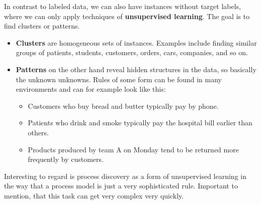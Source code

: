 In contrast to labeled data, we can also have instances without target labels, where we can only apply techniques of \textbf{unsupervised learning}. The goal is to find clusters or patterns.
\begin{itemize}
  \item \textbf{Clusters} are homogeneous sets of instances. Examples include finding {\color{ForestGreen}similar groups of patients, students, customers, orders, cars, companies}, and so on.
  \item \textbf{Patterns} on the other hand reveal hidden structures in the data, so basically the unknown unknowns. Rules of some form can be found in many environments and can for example look like this:
  \begin{itemize}
    \item {\color{ForestGreen}Customers who buy bread and butter typically pay by phone.}
    \item {\color{ForestGreen}Patients who drink and smoke typically pay the hospital bill earlier than others.}
    \item {\color{ForestGreen}Products produced by team A on Monday tend to be returned more frequently by customers.}
  \end{itemize} 
\end{itemize}

Interesting to regard is process discovery as a form of unsupervised learning in the way that a process model is just a very sophisticated rule. Important to mention, that this task can get very complex very quickly.

